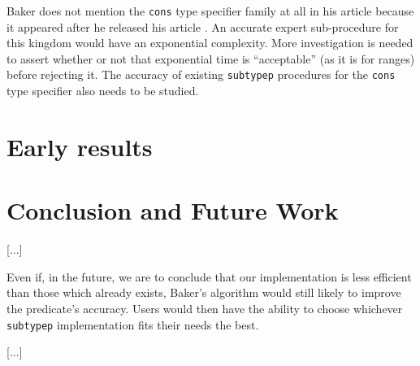 \documentclass[format=sigconf]{acmart}
\newcommand\code[2][\small]{\sloppy\texttt{#1#2}}
\theoremstyle{definition}
\begin{document}
Baker does not mention the \code{cons} type specifier family at all in his
article because it appeared after he released his article \cite{gcl-devel.cons}.
An accurate expert sub-procedure for this kingdom would have an exponential
complexity. More investigation is needed to assert whether or not that
exponential time is ``acceptable'' (as it is for ranges) before rejecting it.
The accuracy of existing \code{subtypep} procedures for the \code{cons} type
specifier also needs to be studied.

\section{Early results}
\label{sec:res}

\section{Conclusion and Future Work}
[...]

Even if, in the future, we are to conclude that our implementation is less
efficient than those which already exists, Baker's algorithm would still likely to
improve the predicate's accuracy. Users would then have the ability to
choose whichever \code{subtypep} implementation fits their needs the best.

[...]


\end{document}
